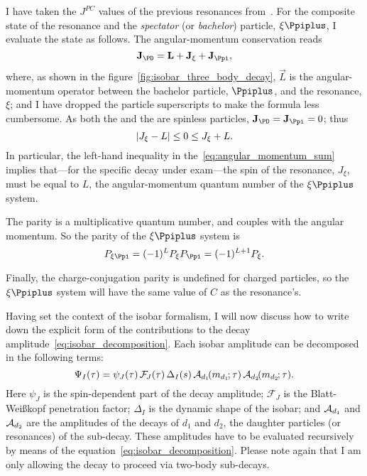    I have taken the $J^{PC}$ values of the previous resonances from~\cite{chinese_phisics}.
    For the composite state of the resonance and the \emph{spectator} (or \emph{bachelor}) particle, $\xi\Ppiplus$, I evaluate the state as follows. 
    The angular-momentum conservation reads
    \begin{equation}
        \vec{J}_{\PD} = \vec{L} + \vec{J}_{\xi} + \vec{J}_{\Ppi},
    \end{equation}
    where, as shown in the figure~\ref{fig:isobar_three_body_decay}, $\vec{L}$ is the angular-momentum operator between the bachelor particle, $\Ppiplus$, and the resonance, $\xi$; and I have dropped the particle superscripts to make the formula less cumbersome.
    As both the \Ppiplus{} and the \PDplus are spinless particles, $\vec{J}_{\PD} = \vec{J}_{\Ppi} = 0$; thus
    \begin{equation}\label{eq:angular_momentum_sum}
        \lvert J_{\xi} - L\rvert \le 0 \le J_{\xi} + L.
    \end{equation}
    In particular, the left-hand inequality in the~\eqref{eq:angular_momentum_sum} implies that---for the specific decay under exam---the spin of the resonance, $J_\xi$, must be equal to $L$, the angular-momentum quantum number of the $\xi\Ppiplus$ system.


    The parity is a multiplicative quantum number, and couples with the angular momentum.
    So the parity of the $\xi\Ppiplus$ system is
    \begin{equation}
        P_{\xi\Ppi} = (-1)^L P_{\xi} P_{\Ppi} = (-1)^{L+1} P_{\xi}.
    \end{equation}


    Finally, the charge-conjugation parity is undefined for charged particles, so the $\xi\Ppiplus$ system will have the same value of $C$ as the resonance's. 


    Having set the context of the isobar formalism, I will now discuss how to write down the explicit form of the contributions to the decay amplitude~\eqref{eq:isobar_decomposition}.
    Each isobar amplitude can be decomposed in the following terms:
    \begin{equation}\label{eq:isobar_amplitude}
        \Psi_I(\tau) = \psi_J(\tau)\,\mathcal{F\!}_{J}(\tau)\,\Delta_I(s)\,\mathcal{A}_{d_1}\!(m_{d_1\!}; \tau)\,\mathcal{A}_{d_2}\!(m_{d_2\!}; \tau).
    \end{equation}
    Here $\psi_J$ is the spin-dependent part of the decay amplitude;
    $\mathcal{F\!}_J$ is the Blatt-Wei\ss{}kopf penetration factor;
    $\Delta_I$ is the dynamic shape of the isobar;
    and $\mathcal{A}_{d_1}$ and $\mathcal{A}_{d_2}$ are the amplitudes of the decays of $d_1$ and $d_2$, the daughter particles (or resonances) of the sub-decay.
    These amplitudes have to be evaluated recursively by means of the equation~\eqref{eq:isobar_decomposition}.
    Please note again that I am only allowing the decay to proceed via two-body sub-decays.


